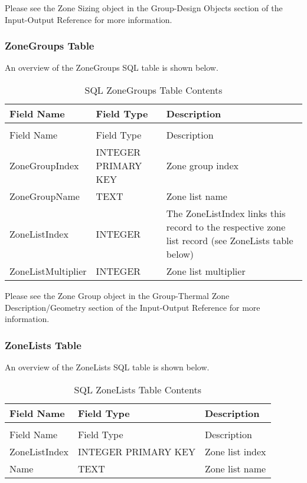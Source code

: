 Please see the Zone Sizing object in the Group-Design Objects section of the Input-Output Reference for more information.

\subsubsection{ZoneGroups Table}

An overview of the ZoneGroups SQL table is shown below.

\begin{longtable}[c]{>{\raggedright}p{1.5in}>{\raggedright}p{1.5in}>{\raggedright}p{3.0in}}
\caption{SQL ZoneGroups Table Contents \label{table:table-33.-sql-zonegroups-table-contents}} \tabularnewline
\toprule 
Field Name & Field Type & Description \tabularnewline
\midrule
\endfirsthead

\caption[]{SQL ZoneGroups Table Contents} \tabularnewline
\toprule 
Field Name & Field Type & Description \tabularnewline
\midrule
\endhead

ZoneGroup\-Index & INTEGER PRIMARY KEY & Zone group index \tabularnewline
ZoneGroupName & TEXT & Zone list name \tabularnewline
ZoneListIndex & INTEGER & The ZoneListIndex links this record to the respective zone list record (see ZoneLists table below) \tabularnewline
ZoneList\-Multiplier & INTEGER & Zone list multiplier \tabularnewline
\bottomrule
\end{longtable}

Please see the Zone Group object in the Group-Thermal Zone Description/Geometry section of the Input-Output Reference for more information.

\subsubsection{ZoneLists Table}

An overview of the ZoneLists SQL table is shown below.

\begin{longtable}[c]{@{}lll@{}}
\caption{SQL ZoneLists Table Contents \label{table:table-34.-sql-zonelists-table-contents}} \tabularnewline
\toprule 
Field Name & Field Type & Description \tabularnewline
\midrule
\endfirsthead

\caption[]{SQL ZoneLists Table Contents} \tabularnewline
\toprule 
Field Name & Field Type & Description \tabularnewline
\midrule
\endhead

ZoneListIndex & INTEGER PRIMARY KEY & Zone list index \tabularnewline
Name & TEXT & Zone list name \tabularnewline
\bottomrule
\end{longtable}


